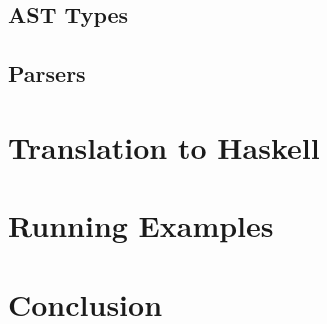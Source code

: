 \documentclass{article}
\def\H{Haskell}
\begin{document}
\subsection{AST Types}

\subsection{Parsers}

\section{Translation to \H}

\section{Running Examples}

\section{Conclusion}
\end{document}
